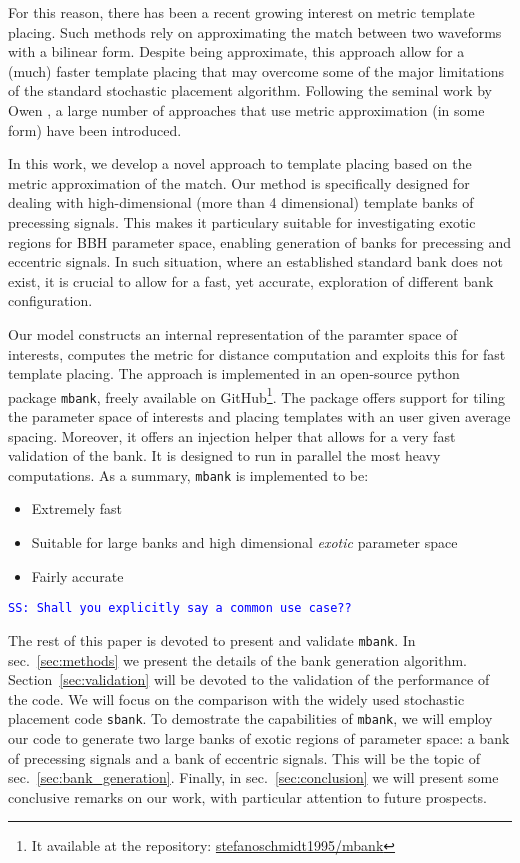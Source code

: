 \documentclass[twocolumn,showpacs,preprintnumbers,nofootinbib,prd,
superscriptaddress,10pt]{revtex4-1}
\newcommand{\stefano}[1]{{\textcolor{blue}{\texttt{SS: #1}} }}
\begin{document}
For this reason, there has been a recent growing interest on metric template placing. Such methods rely on approximating the match between two waveforms with a bilinear form. Despite being approximate, this approach allow for a (much) faster template placing that may overcome some of the major limitations of the standard stochastic placement algorithm.
Following the seminal work by Owen \cite{owen_metric}, a large number of approaches that use metric approximation (in some form) have been introduced.

In this work, we develop a novel approach to template placing based on the metric approximation of the match.
Our method is specifically designed for dealing with high-dimensional (more than 4 dimensional) template banks of precessing signals. This makes it particulary suitable for investigating exotic regions for BBH parameter space, enabling generation of banks for precessing and eccentric signals. In such situation, where an established standard bank does not exist, it is crucial to allow for a fast, yet accurate, exploration of different bank configuration.

Our model constructs an internal representation of the paramter space of interests, computes the metric for distance computation and exploits this for fast template placing.
The approach is implemented in an open-source python package \texttt{mbank}, freely available on GitHub\footnote{
It available at the repository: \href{https://github.com/stefanoschmidt1995/mbank}{stefanoschmidt1995/mbank}}.
The package offers support for tiling the parameter space of interests and placing templates with an user given average spacing. Moreover, it offers an injection helper that allows for a very fast validation of the bank.
It is designed to run in parallel the most heavy computations.
As a summary, \texttt{mbank} is implemented to be:
\begin{itemize}
	\item Extremely fast
	\item Suitable for large banks and high dimensional {\it exotic} parameter space
	\item Fairly accurate
\end{itemize}
\stefano{Shall you explicitly say a common use case??}

The rest of this paper is devoted to present and validate \texttt{mbank}.
In sec.~\ref{sec:methods} we present the details of the bank generation algorithm.
Section~\ref{sec:validation} will be devoted to the validation of the performance of the code. We will focus on the comparison with the widely used stochastic placement code \texttt{sbank}.
To demostrate the capabilities of \texttt{mbank}, we will employ our code to generate two large banks of exotic regions of parameter space: a bank of precessing signals and a bank of eccentric signals. This will be the topic of sec.~\ref{sec:bank_generation}.
Finally, in sec.~\ref{sec:conclusion} we will present some conclusive remarks on our work, with particular attention to future prospects.
\end{document}

